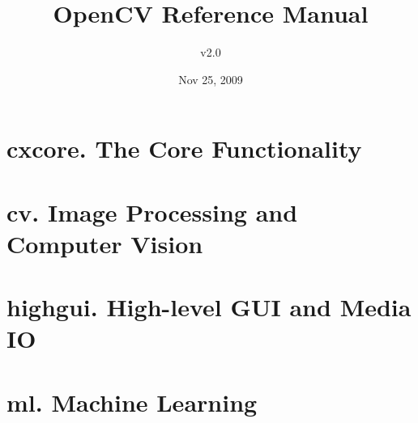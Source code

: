 \documentclass[11pt]{book}
\title{OpenCV Reference Manual}		%
\author{v2.0}		                %
\date{Nov 25, 2009}				%
\begin{document}
\maketitle					%

\setcounter{tocdepth}{8}
\tableofcontents



\chapter{cxcore. The Core Functionality}








\chapter{cv. Image Processing and Computer Vision}











\chapter{highgui. High-level GUI and Media IO}


\chapter{ml. Machine Learning}

\end{document}
